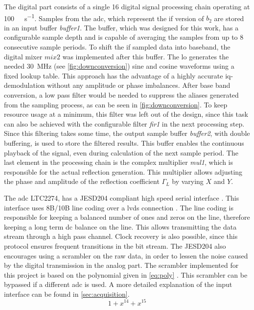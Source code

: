 \documentclass[12pt,a4paper,parskip=full,abstract=true,BCOR=10mm,twoside,open=right]{scrreprt}
\def\device#1{\textit{#1}}
\begin{document}
The digital part consists of a single \SI{16}{\bit} digital signal processing
chain operating at \SI{100}{\mega\samples\per\second}. Samples from
the \gls{adc}, which represent the \gls{if} version of $b_2$ are stored in an input
buffer \device{buffer1}. The buffer, which was designed for this work, has a configurable
sample depth and is capable of averaging the samples from up to 8 consecutive sample
periods. To shift the \gls{if} sampled data into baseband, the digital mixer $mix2$ was implemented
after this buffer. The \gls{lo} generates the needed \SI{30}{\mega\hertz} (see \cref{fig:downconversion})
sine and cosine waveforms using a fixed lookup table. This approach has the
advantage of a highly accurate \gls{iq}-demodulation without any amplitude or
phase imbalances. After base band conversion, a low pass filter would be needed to
suppress the aliases generated from the sampling process, as can be seen in
\cref{fig:downconversion}. To keep resource usage at a minimum, this filter was
left out of the design, since this task can also be achieved with the configurable
filter \device{fir1} in the next processing step. Since this filtering takes some time,
the output sample buffer \device{buffer2}, with double buffering, is used to store
the filtered results. This buffer enables the continuous playback of the signal, even
during calculation of the next sample period. The last element in the processing chain
is the complex multiplier \device{mul1}, which is responsible for the actual reflection
generation. This multiplier allows adjusting the phase and amplitude of the reflection
coefficient $\Gamma_L$ by varying $X$ and $Y$.

The \gls{adc} LTC2274, has a JESD204 compliant high speed serial interface \cite{ltc2274}.
This interface uses 8B/10B line coding over a \gls{lvds} connection \cite{jesd205B.01}. The line coding
is responsible for keeping a balanced number of ones and zeros on the line, therefore keeping a long term
\gls{dc} balance on the line. This allows transmitting the data stream through a high pass
channel. Clock recovery is also possible, since this protocol ensures frequent transitions
in the bit stream. The JESD204 also encourages using a scrambler on the raw data, in order to lessen the
noise caused by the digital transmission in the analog part. The scrambler implemented for
this project is based on the polynomial given in \cref{eq:poly} \cite{jesd205B.01}. This scrambler can
be bypassed if a different \gls{adc} is used. A more detailed explanation of the input interface
can be found in \cref{sec:acquisition}.
\begin{equation}
    \label{eq:poly} 1 + x^{14} + x^{15}
\end{equation}
\end{document}
